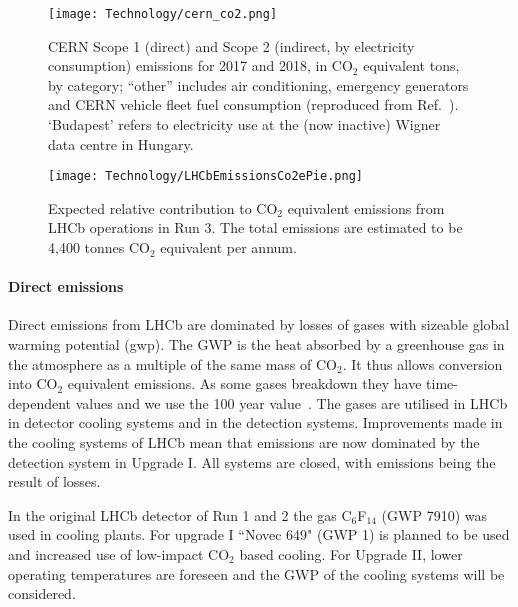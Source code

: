 \documentclass[../SustainableHEP.tex]{subfiles}
\begin{document}
\begin{casestudy}
\begin{figure}
    \captionsetup{type=figure}
    {\texttt{[image: Technology/cern\_co2.png]}}
    \caption[CERN Scope 1 (direct) and Scope 2 (indirect, by electricity consumption) emissions for 2017 and 2018]{CERN Scope 1 (direct) and Scope 2 (indirect, by electricity consumption) emissions for 2017 and 2018, in CO$_2$ equivalent tons, by category; ``other'' includes air conditioning, emergency generators and CERN vehicle fleet fuel consumption (reproduced from Ref.~\cite{envrep2020}).  `Budapest' refers to electricity use at the (now inactive) Wigner data centre in Hungary.}\label{fig:cern_co2}
\end{figure}

\begin{figure}
    \captionsetup{type=figure}
    {\texttt{[image: Technology/LHCbEmissionsCo2ePie.png]}}
    \caption[Expected relative contribution to CO$_2$ equivalent emissions from LHCb operations in Run 3]{Expected relative contribution to CO$_2$ equivalent emissions from LHCb operations in Run 3. The total emissions are estimated to be 4,400 tonnes CO$_2$ equivalent per annum.}\label{fig:lhcb_co2}
\end{figure}

\paragraph{Direct emissions}

Direct emissions from LHCb are dominated by losses of gases with sizeable global warming potential (\acrshort{gwp}). The GWP is the heat absorbed by a greenhouse gas in the atmosphere as a multiple of the same mass of CO$_2$.  It thus allows conversion into CO$_2$ equivalent emissions. As some gases breakdown they have time-dependent values and we use the 100 year value~\cite{AR5}. The gases are utilised in LHCb in detector cooling systems and in the detection systems. Improvements made in the cooling systems of LHCb mean that emissions are now dominated by the detection system in Upgrade I. All systems are closed, with emissions being the result of losses.

In the original LHCb detector of Run 1 and 2
the gas C$_6$F$_{14}$ (GWP 7910) was used in cooling plants. For upgrade I ``Novec 649" (GWP 1) is planned to be used and 
increased use of low-impact CO$_2$ based cooling.
For Upgrade II, lower operating temperatures are foreseen and the GWP of the cooling systems will be considered.


\end{casestudy}
\end{document}

